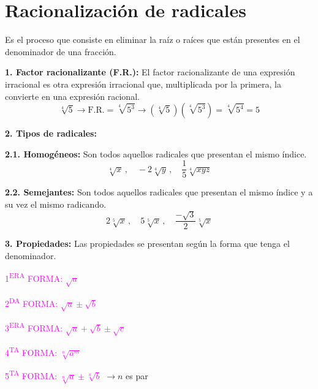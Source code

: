\documentclass[11pt,a4paper]{article}
\begin{document}
\section{Racionalización de radicales}

Es el proceso que consiste en eliminar la raíz o raíces que están presentes en el
denominador de una fracción.

\textbf{1. Factor racionalizante (F.R.):} El factor racionalizante de una expresión
irracional es otra expresión irracional que, multiplicada por la primera, la convierte en
una expresión racional.
\[\sqrt[4]{5} \rightarrow \text{F.R.} = \sqrt[4]{5^3} \rightarrow \left(\sqrt[4]{5}\right)\left(\sqrt[4]{5^3}\right) = \sqrt[4]{5^4} = 5\]

\textbf{2. Tipos de radicales:}

\textbf{2.1. Homogéneos:} Son todos aquellos radicales que presentan el mismo índice.
\[\sqrt[4]{x}\,,\quad -2\sqrt[4]{y}\,,\quad \frac{1}{5}\sqrt[4]{xyz}\]

\textbf{2.2. Semejantes:} Son todos aquellos radicales que presentan el mismo índice y a su
vez el mismo radicando.
\[2\sqrt[5]{x}\,,\quad 5\sqrt[5]{x}\,,\quad \frac{-\sqrt{3}}{2}\sqrt[5]{x}\]

\textbf{3. Propiedades:} Las propiedades se presentan según la forma que tenga el denominador.

\begin{minipage}[t]{0.242\textwidth}
\centering
\textcolor{magenta}{1\textsuperscript{ERA} FORMA: $\sqrt{a}$}\\[6pt]
\end{minipage}\hfill
\begin{minipage}[t]{0.320\textwidth}
\centering
\textcolor{magenta}{2\textsuperscript{DA} FORMA: $\sqrt{a} \pm \sqrt{b}$}\\[6pt]
\end{minipage}\hfill
\begin{minipage}[t]{0.407\textwidth}
\centering
\textcolor{magenta}{3\textsuperscript{ERA} FORMA: $\sqrt{a} + \sqrt{b} \pm \sqrt{c}$}\\[6pt]
\end{minipage}

\bigskip
\begin{minipage}[t]{0.388\textwidth}
\centering
\textcolor{magenta}{4\textsuperscript{TA} FORMA: $\sqrt[n]{a^m}$}\\[6pt]
\end{minipage}\hfill
\begin{minipage}[t]{0.582\textwidth}
\centering
\textcolor{magenta}{5\textsuperscript{TA} FORMA: $\sqrt[n]{a} \pm \sqrt[n]{b}$} $\rightarrow n$ es par\\[6pt]
\end{minipage}
\end{document}
